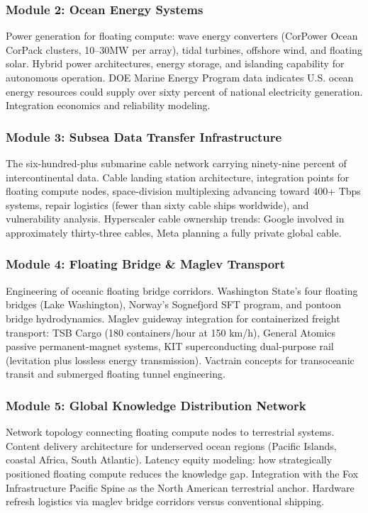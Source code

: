 \documentclass[11pt,letterpaper]{article}
\begin{document}
\subsubsection{Module 2: Ocean Energy Systems}

Power generation for floating compute: wave energy converters (CorPower Ocean CorPack clusters, 10--30MW per array), tidal turbines, offshore wind, and floating solar. Hybrid power architectures, energy storage, and islanding capability for autonomous operation. DOE Marine Energy Program data indicates U.S. ocean energy resources could supply over sixty percent of national electricity generation. Integration economics and reliability modeling.

\subsubsection{Module 3: Subsea Data Transfer Infrastructure}

The six-hundred-plus submarine cable network carrying ninety-nine percent of intercontinental data. Cable landing station architecture, integration points for floating compute nodes, space-division multiplexing advancing toward 400+ Tbps systems, repair logistics (fewer than sixty cable ships worldwide), and vulnerability analysis. Hyperscaler cable ownership trends: Google involved in approximately thirty-three cables, Meta planning a fully private global cable.

\subsubsection{Module 4: Floating Bridge \& Maglev Transport}

Engineering of oceanic floating bridge corridors. Washington State's four floating bridges (Lake Washington), Norway's Sognefjord SFT program, and pontoon bridge hydrodynamics. Maglev guideway integration for containerized freight transport: TSB Cargo (180 containers/hour at 150 km/h), General Atomics passive permanent-magnet systems, KIT superconducting dual-purpose rail (levitation plus lossless energy transmission). Vactrain concepts for transoceanic transit and submerged floating tunnel engineering.

\subsubsection{Module 5: Global Knowledge Distribution Network}

Network topology connecting floating compute nodes to terrestrial systems. Content delivery architecture for underserved ocean regions (Pacific Islands, coastal Africa, South Atlantic). Latency equity modeling: how strategically positioned floating compute reduces the knowledge gap. Integration with the Fox Infrastructure Pacific Spine as the North American terrestrial anchor. Hardware refresh logistics via maglev bridge corridors versus conventional shipping.
\end{document}
